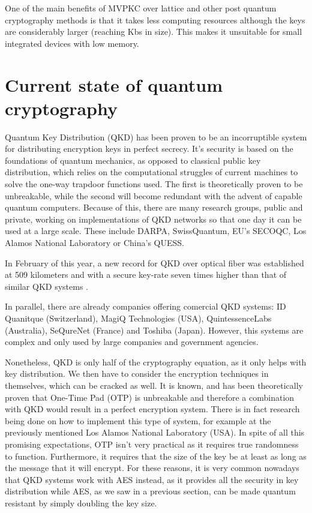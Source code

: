 One of the main benefits of MVPKC over lattice and other post quantum
cryptography methods is that it takes less computing resources although the keys
are considerably larger (reaching Kbs in size). This makes it unsuitable for
small integrated devices with low memory.

\pagebreak
\section{Current state of quantum cryptography}

Quantum Key Distribution (QKD) has been proven to be an incorruptible system
for distributing encryption keys in perfect secrecy.  It's security is 
based on the foundations of quantum mechanics, as opposed to classical public
key distribution, which relies on the computational struggles of current
machines to solve the one-way trapdoor functions used. The first is 
theoretically proven to be unbreakable, while the second will become redundant
with the advent of capable quantum computers.
Because of this, there are many research groups, public and private,
working on implementations of QKD networks so that one day it can be used 
at a large scale. These include DARPA, SwissQuantum, EU's SECOQC, Los Alamos 
National Laboratory or China's QUESS.

In February of this year, a new record for QKD over optical fiber was established at 509 kilometers and with a secure key-rate seven times higher
than that of similar QKD systems \cite{qkd_509_km_2019}.

In parallel, there are already companies offering comercial QKD systems:
ID Quanitque (Switzerland), MagiQ Technologies (USA), QuintessenceLabs 
(Australia), SeQureNet (France) and Toshiba (Japan). However, this systems are 
complex and only used by large companies and government agencies.

Nonetheless, QKD is only half of the cryptography equation, as it only helps
with key distribution. We then have to consider the encryption techniques
in themselves, which can be cracked as well. It is known, and has been
theoretically proven that One-Time Pad (OTP) is unbreakable and therefore
a combination with QKD would result in a perfect encryption system. There
is in fact research being done on how to implement this type of system, for
example at the previously mentioned Los Alamos National Laboratory (USA).
In spite of all this promising expectations, OTP isn't very practical as it
requires true randomness to function. Furthermore, it requires that the size
of the key be at least as long as the message that it will encrypt.
For these reasons, it is very common
nowadays that QKD systems work with AES instead, as it provides all the security
in key distribution while AES, as we saw in a previous section, can be made
quantum resistant by simply doubling the key size.



